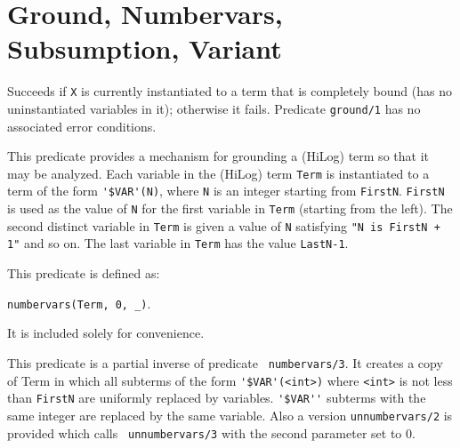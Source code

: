 \section{Ground, Numbervars, Subsumption, Variant} \label{NumberVars}

\begin{description}
    Succeeds if {\tt X} is currently instantiated to a term that is 
    completely bound (has no uninstantiated variables in it); 
    otherwise it fails.  Predicate {\tt ground/1} has no associated 
    error conditions.

    This predicate provides a mechanism for grounding a (HiLog) term
    so that it may be analyzed.  Each variable in the (HiLog) term
    {\tt Term} is instantiated to a term of the form \verb|'$VAR'(N)|,
    where {\tt N} is an integer starting from {\tt FirstN}.  
    {\tt FirstN} is used as the value of {\tt N} for the first
    variable in {\tt Term} (starting from the left). The second distinct
    variable in {\tt Term} is given a value of {\tt N} satisfying
    {\tt "N is FirstN + 1"} and so on.  The last variable in {\tt Term}
    has the value {\tt LastN-1}.

    This predicate is defined as:
    \begin{center}
    {\tt   numbervars(Term, 0, \_)}.
    \end{center}
    It is included solely for convenience.


    This predicate is a partial inverse of predicate {\tt
    numbervars/3}.  It creates a copy of Term in which all subterms of
    the form \verb|'$VAR'(<int>)| where \verb|<int>| is not less than
    {\tt FirstN} are uniformly replaced by variables.  \verb|'$VAR''|
    subterms with the same integer are replaced by the same variable.
    Also a version {\tt unnumbervars/2} is provided which calls {\tt
    unnumbervars/3} with the second parameter set to 0.


\end{description}
